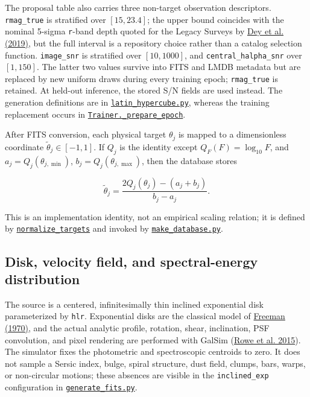 \documentclass[11pt]{article}
\newcommand{\code}[1]{\nolinkurl{#1}}
\begin{document}
The proposal table also carries three non-target observation descriptors.
\code{rmag_true} is stratified over \([15,23.4]\); the upper bound coincides with
the nominal 5-sigma \code{r}-band depth quoted for the Legacy Surveys by \hyperlink{ref:dey2019}{Dey et al. (2019)}, but the full interval is a repository choice rather than a
catalog selection function. \code{image_snr} is stratified over \([10,1000]\), and
\code{central_halpha_snr} over \([1,150]\). The latter two values survive into FITS
and LMDB metadata but are replaced by new uniform draws during every training
epoch; \code{rmag_true} is retained. At held-out inference, the stored S/N fields are
used instead. The generation definitions are in
\href{../data_generate/latin_hypercube.py}{\code{latin_hypercube.py}}, whereas the
training replacement occurs in \href{../arch/train.py}{\code{Trainer._prepare_epoch}}.

After FITS conversion, each physical target \(\theta_j\) is mapped to a
dimensionless coordinate \(\widetilde{\theta}_j\in[-1,1]\). If \(Q_j\)
is the identity except \(Q_F(F)=\log_{10}F\), and
\(a_j=Q_j(\theta_{j,\min})\),
\(b_j=Q_j(\theta_{j,\max})\), then the database stores

\[
\widetilde{\theta}_j =
\frac{2Q_j(\theta_j)-(a_j+b_j)}{b_j-a_j}.
\]

This is an implementation identity, not an empirical scaling relation; it is
defined by \href{../arch/utils.py}{\code{normalize_targets}} and invoked by
\href{../data_generate/make_database.py}{\code{make_database.py}}.

\subsection{Disk, velocity field, and spectral-energy distribution}

The source is a centered, infinitesimally thin inclined exponential disk
parameterized by \code{hlr}. Exponential disks are the classical model of \hyperlink{ref:freeman1970}{Freeman (1970)}, and the actual analytic profile, rotation, shear,
inclination, PSF convolution, and pixel rendering are performed with GalSim
(\hyperlink{ref:rowe2015}{Rowe et al. 2015}). The simulator fixes the photometric and
spectroscopic centroids to zero. It does not sample a Sersic index, bulge,
spiral structure, dust field, clumps, bars, warps, or non-circular motions;
these absences are visible in the \code{inclined_exp} configuration in
\href{../data_generate/generate_fits.py}{\code{generate_fits.py}}.
\end{document}
